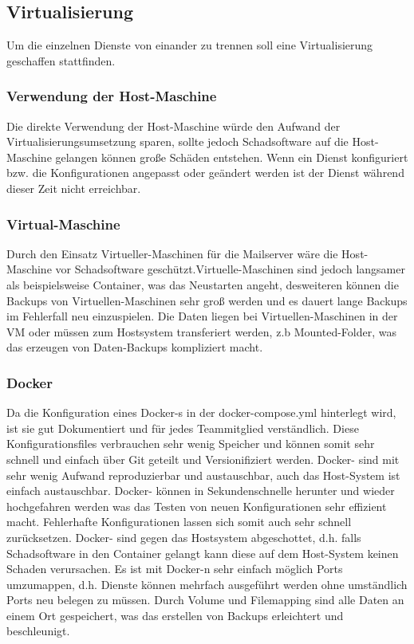 \documentclass[a4paper,11pt,singlespacing]{article}
\begin{document}
	\subsection{Virtualisierung}\label{sec:Virtualisierung}
		Um die einzelnen Dienste von einander zu trennen soll eine Virtualisierung geschaffen stattfinden.

		\subsubsection{Verwendung der Host-Maschine}\label{Verwendung der Host-Maschine}
			Die direkte Verwendung der Host-Maschine würde den Aufwand der Virtualisierungsumsetzung sparen, sollte jedoch Schadsoftware auf die Host-Maschine gelangen können große Schäden entstehen. Wenn ein Dienst konfiguriert bzw. die Konfigurationen angepasst oder geändert werden ist der Dienst während dieser Zeit nicht erreichbar.

		\subsubsection{Virtual-Maschine}\label{Virtual-Maschine}
			Durch den Einsatz Virtueller-Maschinen für die Mailserver wäre die Host-Maschine vor Schadsoftware geschützt.Virtuelle-Maschinen sind jedoch langsamer als beispielsweise Container, was das Neustarten angeht, desweiteren können die Backups von Virtuellen-Maschinen sehr groß werden und es dauert lange Backups im Fehlerfall neu einzuspielen. Die Daten liegen bei Virtuellen-Maschinen in der VM oder müssen zum Hostsystem transferiert werden, z.b Mounted-Folder, was das erzeugen von Daten-Backups kompliziert macht.

		\subsubsection{Docker}\label{Docker}
			Da die Konfiguration eines  Docker-s in der docker-compose.yml hinterlegt wird, ist sie gut Dokumentiert und für jedes Teammitglied verständlich. Diese Konfigurationsfiles verbrauchen sehr wenig Speicher und können somit sehr schnell und einfach über Git geteilt und Versionifiziert werden. Docker- sind mit sehr wenig Aufwand reproduzierbar und austauschbar, auch das Host-System ist einfach austauschbar. Docker- können in Sekundenschnelle herunter und wieder hochgefahren werden was das Testen von neuen Konfigurationen sehr effizient macht. Fehlerhafte Konfigurationen lassen sich somit auch sehr schnell zurücksetzen. Docker- sind gegen das Hostsystem abgeschottet, d.h. falls Schadsoftware in den Container gelangt kann diese auf dem Host-System keinen Schaden verursachen. Es ist mit Docker-n sehr einfach möglich Ports umzumappen, d.h. Dienste können mehrfach ausgeführt werden ohne umständlich Ports neu belegen zu müssen. 	Durch Volume und Filemapping sind alle Daten an einem Ort gespeichert, was das erstellen von Backups erleichtert und beschleunigt.
\end{document}
